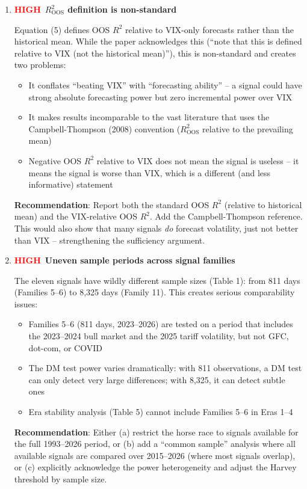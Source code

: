 \documentclass[12pt,a4paper]{article}
\newcommand{\HIGH}{\textcolor{red}{\textbf{HIGH}}}
\begin{document}
\begin{enumerate}[label=D3.\arabic*]

\item \HIGH\ \textbf{$R^2_{\text{OOS}}$ definition is non-standard}

Equation (5) defines OOS $R^2$ relative to VIX-only forecasts rather than the historical mean. While the paper acknowledges this (``note that this is defined relative to VIX (not the historical mean)''), this is non-standard and creates two problems:
\begin{itemize}
    \item It conflates ``beating VIX'' with ``forecasting ability'' -- a signal could have strong absolute forecasting power but zero incremental power over VIX
    \item It makes results incomparable to the vast literature that uses the Campbell-Thompson (2008) convention ($R^2_{\text{OOS}}$ relative to the prevailing mean)
    \item Negative OOS $R^2$ relative to VIX does not mean the signal is useless -- it means the signal is worse than VIX, which is a different (and less informative) statement
\end{itemize}
\textbf{Recommendation}: Report both the standard OOS $R^2$ (relative to historical mean) and the VIX-relative OOS $R^2$. Add the Campbell-Thompson reference. This would also show that many signals \emph{do} forecast volatility, just not better than VIX -- strengthening the sufficiency argument.

\item \HIGH\ \textbf{Uneven sample periods across signal families}

The eleven signals have wildly different sample sizes (Table 1): from 811 days (Families 5--6) to 8,325 days (Family 11). This creates serious comparability issues:
\begin{itemize}
    \item Families 5--6 (811 days, 2023--2026) are tested on a period that includes the 2023--2024 bull market and the 2025 tariff volatility, but not GFC, dot-com, or COVID
    \item The DM test power varies dramatically: with 811 observations, a DM test can only detect very large differences; with 8,325, it can detect subtle ones
    \item Era stability analysis (Table 5) cannot include Families 5--6 in Eras 1--4
\end{itemize}
\textbf{Recommendation}: Either (a) restrict the horse race to signals available for the full 1993--2026 period, or (b) add a ``common sample'' analysis where all available signals are compared over 2015--2026 (where most signals overlap), or (c) explicitly acknowledge the power heterogeneity and adjust the Harvey threshold by sample size.


\end{enumerate}
\end{document}
